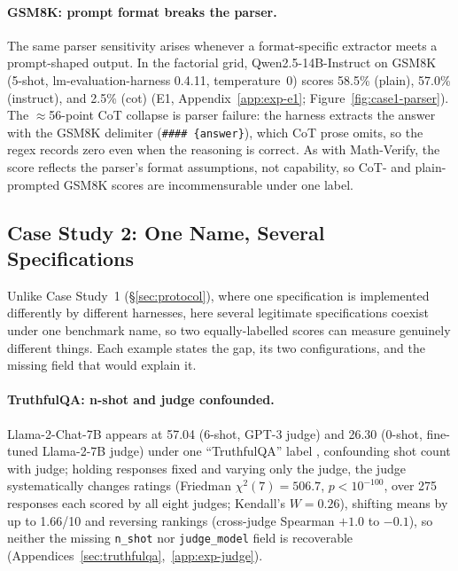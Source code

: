 \documentclass[11pt]{article}
\begin{document}
\paragraph{GSM8K: prompt format breaks the parser.}\label{sec:gsm8k}
The same parser sensitivity arises whenever a format-specific extractor meets a
prompt-shaped output. In the factorial grid, Qwen2.5-14B-Instruct on GSM8K
(5-shot, lm-evaluation-harness 0.4.11, temperature~0) scores 58.5\% (plain),
57.0\% (instruct), and 2.5\% (cot) (E1, Appendix~\ref{app:exp-e1};
Figure~\ref{fig:case1-parser}). The $\approx$56-point CoT collapse is parser
failure: the harness extracts the answer with the GSM8K delimiter
(\texttt{\#\#\#\#~\{answer\}}), which CoT prose omits, so the regex records zero
even when the reasoning is correct. As with Math-Verify, the score reflects the
parser's format assumptions, not capability, so CoT- and plain-prompted
GSM8K scores are incommensurable under one label.

\subsection{Case Study 2: One Name, Several Specifications}
\label{sec:onenametwo}

Unlike Case Study~1 (\S\ref{sec:protocol}), where one specification is implemented
differently by different harnesses, here several legitimate specifications coexist
under one benchmark name, so two equally-labelled scores can measure genuinely
different things. Each example states the gap, its two configurations, and
the missing field that would explain it.

\paragraph{TruthfulQA: n-shot and judge confounded.} Llama-2-Chat-7B appears at
57.04 (6-shot, GPT-3 judge) and 26.30 (0-shot, fine-tuned Llama-2-7B judge) under
one ``TruthfulQA'' label \citep{lin2022truthfulqa}, confounding shot count with
judge; holding responses fixed and varying only the judge, the judge
systematically changes ratings (Friedman
$\chi^2(7)=506.7$, $p<10^{-100}$, over 275 responses each scored by all eight
judges; Kendall's $W=0.26$), shifting means by up to 1.66/10 and reversing rankings
(cross-judge Spearman $+1.0$ to $-0.1$), so neither the missing \texttt{n\_shot}
nor \texttt{judge\_model} field is recoverable
(Appendices~\ref{sec:truthfulqa},~\ref{app:exp-judge}).
\end{document}
